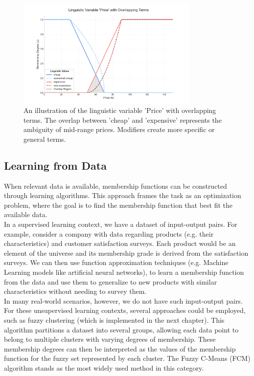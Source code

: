 \begin{figure}[!ht]
    \centering
    \includegraphics[width=0.8\textwidth]{ch2/figures/fuzzy_var_car_example.png}
    \caption{An illustration of the linguistic variable 'Price' with overlapping terms. The overlap between 'cheap' and 'expensive' represents the ambiguity of mid-range prices. Modifiers create more specific or general terms.}
    \label{fig:linguistic_variable_overlap}
\end{figure}


\subsection{Learning from Data}
When relevant data is available, membership functions can be constructed through learning algorithms. This approach frames the task as an optimization problem, where the goal is to find the membership function that best fit the available data.\\

In a supervised learning context, we have a dataset of input-output pairs. For example, consider a company with data regarding products (e.g. their characteristics) and customer satisfaction surveys. Each product would be an element of the universe and its membership grade is derived from the satisfaction surveys. We can then use function approximation techniques (e.g. Machine Learning models like artificial neural networks), to learn a membership function from the data and use them to generalize to new products with similar characteristics without needing to survey them.\\

In many real-world scenarios, however, we do not have such input-output pairs. For these unsupervised learning contexts, several approaches could be employed, such as fuzzy clustering (which is implemented in the next chapter). This algorithm partitions a dataset into several groups, allowing each data point to belong to multiple clusters with varying degrees of membership. These membership degrees can then be interpreted as the values of the membership function for the fuzzy set represented by each cluster. The Fuzzy C-Means (FCM) algorithm \cite{bezdek1984fcm} stands as the most widely used method in this category.

